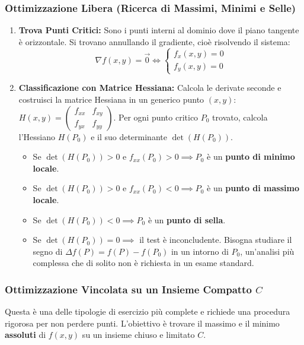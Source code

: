 \documentclass[a4paper, 12pt]{article}
\begin{document}
\subsubsection{Ottimizzazione Libera (Ricerca di Massimi, Minimi e Selle)}
\begin{enumerate}
    \item \textbf{Trova Punti Critici:} Sono i punti interni al dominio dove il piano tangente è orizzontale. Si trovano annullando il gradiente, cioè risolvendo il sistema: 
    \[ \nabla f(x,y) = \vec{0} \iff \begin{cases} f_x(x,y) = 0 \\ f_y(x,y) = 0 \end{cases} \]
    \item \textbf{Classificazione con Matrice Hessiana:} Calcola le derivate seconde e costruisci la matrice Hessiana in un generico punto $(x,y)$:
     $H(x,y) = \begin{pmatrix} f_{xx} & f_{xy} \\ f_{yx} & f_{yy} \end{pmatrix}$. 
     Per ogni punto critico $P_0$ trovato, calcola l'Hessiano $H(P_0)$ e il suo determinante $\det(H(P_0))$.
    \begin{itemize}
        \item Se $\det(H(P_0)) > 0$ e $f_{xx}(P_0) > 0 \implies P_0$ è un \textbf{punto di minimo locale}. 
        \item Se $\det(H(P_0)) > 0$ e $f_{xx}(P_0) < 0 \implies P_0$ è un \textbf{punto di massimo locale}. 
        \item Se $\det(H(P_0)) < 0 \implies P_0$ è un \textbf{punto di sella}. 
        \item Se $\det(H(P_0)) = 0 \implies$ il test è inconcludente.  Bisogna studiare il segno di $\Delta f(P) = f(P) - f(P_0)$ in un intorno di $P_0$, un'analisi più complessa che di solito non è richiesta in un esame standard. 
    \end{itemize}
\end{enumerate}

\subsubsection{Ottimizzazione Vincolata su un Insieme Compatto \texorpdfstring{$C$}{C}}
Questa è una delle tipologie di esercizio più complete e richiede una procedura rigorosa per non perdere punti. L'obiettivo è trovare il massimo e il minimo \textbf{assoluti} di $f(x,y)$ su un insieme chiuso e limitato $C$.
\end{document}
